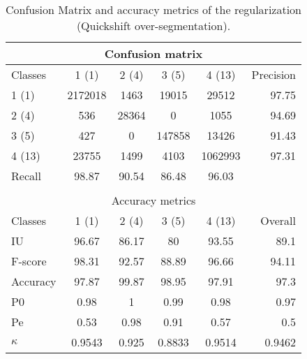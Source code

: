 \begin{table}[H]
\begin{center}
\footnotesize
\begin{tabular}{|l|c|c|c|c|r|}
\hline
\multicolumn{6}{|c|}{Confusion matrix} \\
\hline
 Classes & 1 (1) & 2 (4) & 3 (5) & 4 (13) & Precision \\
\hline
1 (1) & 2172018 & 1463 & 19015 & 29512 & 97.75 \\
\hline
2 (4) & 536 & 28364 & 0 & 1055 & 94.69 \\
\hline
3 (5) & 427 & 0 & 147858 & 13426 & 91.43 \\
\hline
4 (13) & 23755 & 1499 & 4103 & 1062993 & 97.31 \\
\hline
Recall & 98.87 & 90.54 & 86.48 & 96.03 &  \\
\hline
\multicolumn{6}{c}{ } \\
\hline
\multicolumn{6}{|c|}{Accuracy metrics} \\
\hline
 Classes & 1 (1) & 2 (4) & 3 (5) & 4 (13) & Overall \\
\hline
IU & 96.67 & 86.17 & 80 & 93.55 & 89.1 \\
\hline
F-score & 98.31 & 92.57 & 88.89 & 96.66 & 94.11 \\
\hline
Accuracy & 97.87 & 99.87 & 98.95 & 97.91 & 97.3 \\
\hline
P0 & 0.98 & 1 & 0.99 & 0.98 & 0.97 \\
\hline
Pe & 0.53 & 0.98 & 0.91 & 0.57 & 0.5 \\
\hline
$\kappa$ & 0.9543 & 0.925 & 0.8833 & 0.9514 & 0.9462 \\
\hline
\end{tabular}
\caption{Confusion Matrix and accuracy metrics of the regularization (Quickshift over-segmentation).}
\label{table:}
\end{center}
\end{table}
